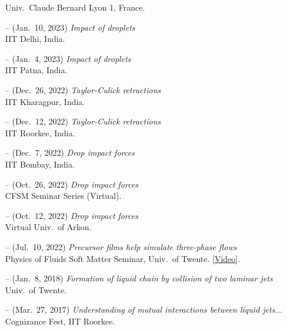 \documentclass[10pt,a4paper,colorlinks,linkcolor=blue,urlcolor=blue,citecolor=blue]{moderncv}
\begin{document}
\begin{itemize}[leftmargin=1.25em]
  Univ.~Claude Bernard Lyon 1, France.
\item[--] (Jan.~10, 2023) \emph{Impact of droplets} \\
  IIT Delhi, India.
\item[--] (Jan.~4, 2023) \emph{Impact of droplets} \\
  IIT Patna, India.
\item[--] (Dec.~26, 2022) \emph{Taylor-Culick retractions} \\
  IIT Kharagpur, India.
\item[--] (Dec.~12, 2022) \emph{Taylor-Culick retractions} \\
  IIT Roorkee, India.
\item[--] (Dec.~7, 2022) \emph{Drop impact forces} \\
  IIT Bombay, India.
\item[--] (Oct.~26, 2022) \emph{Drop impact forces} \\
  CFSM Seminar Series (Virtual).
\item[--] (Oct.~12, 2022) \emph{Drop impact forces} \\
  Virtual Univ.~of Arkon.
\item[--] (Jul.~10, 2022) \emph{Precursor films help simulate three-phase flows} \\
  Physics of Fluids Soft Matter Seminar, Univ.~of Twente. \href{https://youtu.be/ozrnYe8u1HA?si=DA4JIFjNozmPsQuE}{[Video]}.
\item[--] (Jan.~8, 2018) \emph{Formation of liquid chain by collision of two laminar jets} \\
  Univ.~of Twente.
\item[--] (Mar.~27, 2017) \emph{Understanding of mutual interactions between liquid jets...} \\
  Cognizance Fest, IIT Roorkee.
\end{itemize}
\end{document}
